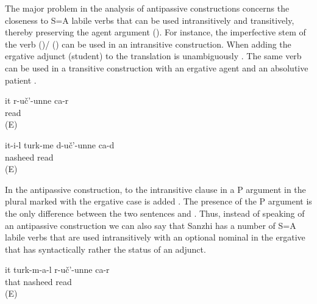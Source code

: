 The major problem in the analysis of antipassive constructions concerns the closeness to S=A labile verbs that can be used intransitively and transitively, thereby preserving the agent argument (). For instance, the imperfective stem of the verb  ()\slash{} ()  can be used in an intransitive construction. When adding the ergative adjunct  (student) to  the translation is unambiguously . The same verb can be used in a transitive construction with an ergative agent and an absolutive patient .
%
\begin{exe}
	\ex	\label{ex:She reads / studies}
	\gll	it	r-uč'-unne	ca-r\\
			read	\\
	\glt	{} (E)

	\ex	\label{ex:S/he reads (i.e. sings) nasheeds@varA}
	\gll	it-i-l	turk-me	d-uč'-unne	ca-d\\
			nasheed	read	\\
	\glt	{} (E)
\end{exe}

In the antipassive construction, to the intransitive clause in  a P argument in the plural marked with the ergative case is added . The presence of the P argument is the only difference between the two sentences  and . Thus, instead of speaking of an antipassive construction we can also say that Sanzhi has a number of S=A labile verbs that are used intransitively with an optional nominal in the ergative that has syntactically rather the status of an adjunct.
%
\begin{exe}
	\ex	\label{ex:She reads (i.e. sings) nasheeds@varB}
	\gll	it	turk-m-a-l	r-uč'-unne	ca-r\\
		that	nasheed	read	\\
	\glt	{} (E)
\end{exe}

